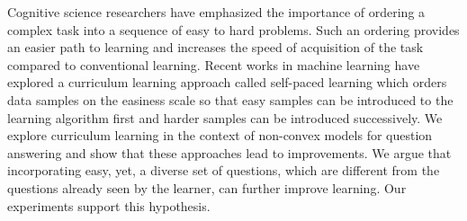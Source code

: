 Cognitive science researchers have emphasized the importance of ordering a complex task into a sequence of easy to hard problems. Such an ordering provides an easier path to learning and increases the speed of acquisition of the task compared to conventional learning. Recent works in machine learning have explored a curriculum learning approach called self-paced learning which orders data samples on the easiness scale so that easy samples can be introduced to the learning algorithm first and harder samples can be introduced successively. We explore curriculum learning in the context of non-convex models for question answering and show that these approaches lead to improvements. We argue that incorporating easy, yet, a diverse set of questions, which are different from the questions already seen by the learner, can further improve learning. Our experiments support this hypothesis.
